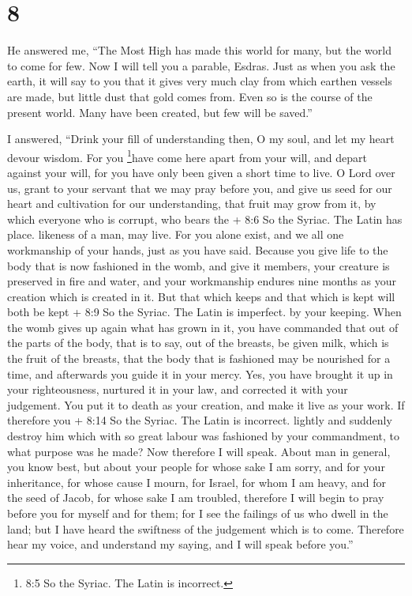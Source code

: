 \hypertarget{section-7}{%
\section{8}\label{section-7}}

 He answered me, ``The Most High has made this world for
many, but the world to come for few.  Now I will tell you a
parable, Esdras. Just as when you ask the earth, it will say to you that
it gives very much clay from which earthen vessels are made, but little
dust that gold comes from. Even so is the course of the present world.
 Many have been created, but few will be saved.''

 I answered, ``Drink your fill of understanding then, O my
soul, and let my heart devour wisdom.  For you
\footnote{8:5 So the Syriac. The Latin is incorrect.}have come here
apart from your will, and depart against your will, for you have only
been given a short time to live.  O Lord over us, grant to
your servant that we may pray before you, and give us seed for our heart
and cultivation for our understanding, that fruit may grow from it, by
which everyone who is corrupt, who bears the + 8:6 So the Syriac. The
Latin has place. likeness of a man, may live.  For you alone
exist, and we all one workmanship of your hands, just as you have said.
 Because you give life to the body that is now fashioned in
the womb, and give it members, your creature is preserved in fire and
water, and your workmanship endures nine months as your creation which
is created in it.  But that which keeps and that which is
kept will both be kept + 8:9 So the Syriac. The Latin is imperfect. by
your keeping. When the womb gives up again what has grown in it,
 you have commanded that out of the parts of the body, that
is to say, out of the breasts, be given milk, which is the fruit of the
breasts,  that the body that is fashioned may be nourished
for a time, and afterwards you guide it in your mercy. 
Yes, you have brought it up in your righteousness, nurtured it in your
law, and corrected it with your judgement.  You put it to
death as your creation, and make it live as your work.  If
therefore you + 8:14 So the Syriac. The Latin is incorrect. lightly and
suddenly destroy him which with so great labour was fashioned by your
commandment, to what purpose was he made?  Now therefore I
will speak. About man in general, you know best, but about your people
for whose sake I am sorry,  and for your inheritance, for
whose cause I mourn, for Israel, for whom I am heavy, and for the seed
of Jacob, for whose sake I am troubled,  therefore I will
begin to pray before you for myself and for them; for I see the failings
of us who dwell in the land;  but I have heard the
swiftness of the judgement which is to come.  Therefore
hear my voice, and understand my saying, and I will speak before you.''

